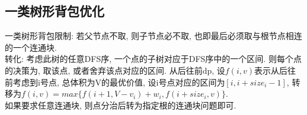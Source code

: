 \subsection{一类树形背包优化}
\noindent
一类树形背包限制: 若父节点不取, 则子节点必不取, 也即最后必须取与根节点相连的一个连通块.\\
转化: 考虑此树的任意DFS序, 一个点的子树对应于DFS序中的一个区间. 则每个点的决策为, 取该点, 或者舍弃该点对应的区间. 从后往前dp, 设$f(i, v)$表示从后往前考虑到i号点, 总体积为V的最优价值, 设i号点对应的区间为$[i,i+size_i-1]$, 转移为$f(i, v)=max\{f(i+1, V-v_i)+w_i, f(i+size_i, v)\}$.\\
如果要求任意连通块, 则点分治后转为指定根的连通块问题即可.
